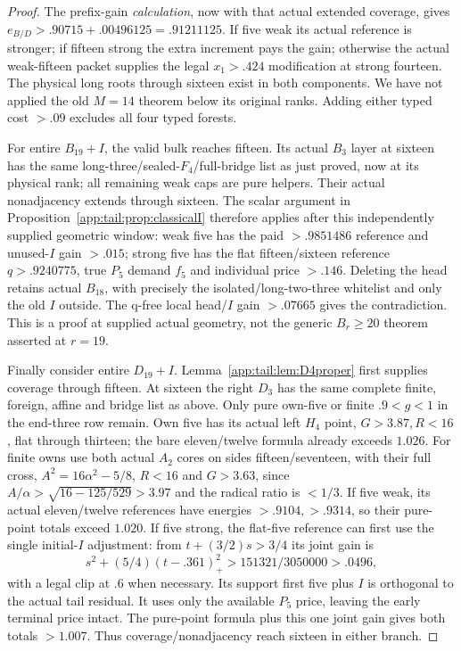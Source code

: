 \begin{proof}
The prefix-gain \emph{calculation}, now with that actual extended
coverage, gives $e_{B/D}>.90715+.00496125=.91211125$.
If five weak its actual reference is stronger; if fifteen strong
the extra increment pays the gain; otherwise the actual weak-fifteen
packet supplies the legal $x_1>.424$ modification at strong fourteen.
The physical long roots through sixteen exist in both components.
We have not applied the old $M=14$ theorem below its original ranks.
Adding either typed cost $>.09$ excludes all four typed forests.

For entire $B_{19}+I$, the valid bulk reaches fifteen. Its actual
$B_3$ layer at sixteen has the same long-three/sealed-$F_4$/full-bridge
list as just proved, now at its physical rank; all remaining weak
caps are pure helpers. Their actual nonadjacency extends through
sixteen. The scalar argument in
Proposition~\ref{app:tail:prop:classicalI} therefore applies after
this independently supplied geometric window: weak five has the
paid $>.9851486$ reference and unused-$I$ gain $>.015$; strong
five has the flat fifteen/sixteen reference $q>.9240775$, true
$P_5$ demand $f_5$ and individual price $>.146$.
Deleting the head retains actual $B_{18}$, with precisely the
isolated/long-two-three whitelist and only the old $I$ outside.
The q-free local head/$I$ gain $>.07665$ gives the contradiction.
This is a proof at supplied actual geometry, not the generic
$B_r\ge20$ theorem asserted at $r=19$.

Finally consider entire $D_{19}+I$. Lemma~\ref{app:tail:lem:D4proper}
first supplies coverage through fifteen. At sixteen the right $D_3$
has the same complete finite, foreign, affine and bridge list as above.
Only pure own-five or finite $.9<g<1$ in the end-three row remain.
Own five has its actual left $H_4$ point, $G>3.87,R<16$, flat
through thirteen; the bare eleven/twelve formula already exceeds
$1.026$. For finite owns use both actual $A_2$ cores on sides
fifteen/seventeen, with their full cross, $A^2=16\alpha^2-5/8$,
$R<16$ and $G>3.63$, since
$A/\alpha>\sqrt{16-125/529}>3.97$ and the radical ratio is $<1/3$.
If five weak, its actual eleven/twelve references have energies
$>.9104,>.9314$, so their pure-point totals exceed $1.020$.
If five strong, the flat-five reference can first use the single
initial-$I$ adjustment: from $t+(3/2)s>3/4$ its joint gain is
\[
 s^2+(5/4)(t-.361)_+^2>151321/3050000>.0496,
\]
with a legal clip at $.6$ when necessary. Its support first five
plus $I$ is orthogonal to the actual tail residual. It uses only
the available $P_5$ price, leaving the early terminal price intact.
The pure-point formula plus this one joint gain gives both totals
$>1.007$. Thus coverage/nonadjacency reach sixteen in either branch.


\end{proof}
